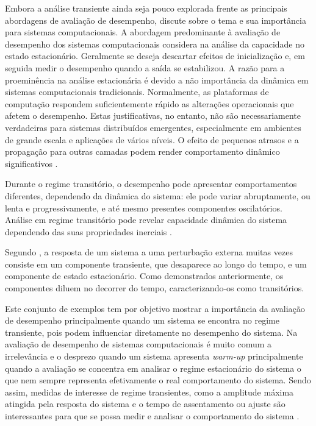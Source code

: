 Embora a análise transiente ainda seja pouco explorada frente as principais abordagens de avaliação de desempenho,  discute sobre o tema e sua importância para sistemas computacionais. A abordagem predominante à avaliação de desempenho dos sistemas computacionais considera na análise da capacidade no estado estacionário. Geralmente se deseja descartar efeitos de inicialização e, em seguida medir o desempenho quando a saída se estabilizou. A razão para a proeminência na análise estacionária é devido a não importância da dinâmica em sistemas computacionais tradicionais. Normalmente, as plataformas de computação respondem suficientemente rápido as alterações operacionais que afetem o desempenho. Estas justificativas, no entanto, não são necessariamente verdadeiras para sistemas distribuídos emergentes, especialmente em ambientes de grande escala e aplicações de vários níveis. O efeito de pequenos atrasos e a propagação para outras camadas podem render comportamento dinâmico significativos \cite{Lourenco2015}.

Durante o regime transitório, o desempenho pode apresentar comportamentos diferentes, dependendo da dinâmica do sistema: ele pode variar abruptamente, ou lenta e progressivamente, e até mesmo presentes componentes oscilatórios. Análise em regime transitório pode revelar capacidade dinâmica do sistema dependendo das suas propriedades inerciais \cite{Lourenco2015}.

Segundo , a resposta de um sistema a uma perturbação externa muitas vezes consiste em um componente transiente, que desaparece ao longo do tempo, e um componente de estado estacionário. Como demonstrados anteriormente, os componentes diluem no decorrer do tempo, caracterizando-os como transitórios. 

Este conjunto de exemplos tem por objetivo mostrar a importância da avaliação de desempenho principalmente quando um sistema se encontra no regime transiente, pois podem influenciar diretamente no desempenho do sistema. Na avaliação de desempenho de sistemas computacionais é muito comum a irrelevância e o desprezo quando um sistema apresenta \textit{warm-up}  principalmente quando a avaliação se concentra em analisar o regime estacionário do sistema o que nem sempre representa efetivamente o real comportamento do sistema. Sendo assim, medidas de interesse de regime transientes, como a amplitude máxima atingida pela resposta do sistema e o tempo de assentamento ou ajuste são interessantes para que se possa medir e analisar o comportamento do sistema \cite{Nobile2013}.


